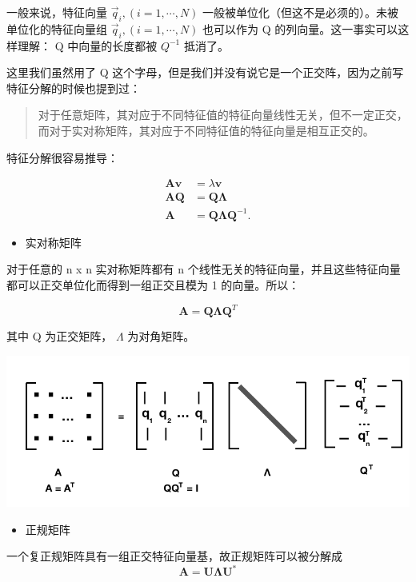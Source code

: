 \documentclass[
]{book}
\providecommand{\tightlist}{%
  \setlength{\itemsep}{0pt}\setlength{\parskip}{0pt}}
\begin{document}
一般来说，特征向量 \(\vec{q}_i, ( i = 1, \cdots, N)\) 一般被单位化（但这不是必须的）。未被单位化的特征向量组 \(\vec{q}_i, ( i = 1, \cdots, N)\) 也可以作为 Q 的列向量。这一事实可以这样理解： Q 中向量的长度都被 \(Q^{-1}\) 抵消了。

这里我们虽然用了 Q 这个字母，但是我们并没有说它是一个正交阵，因为之前写特征分解的时候也提到过：

\begin{quote}
对于任意矩阵，其对应于不同特征值的特征向量线性无关，但不一定正交，而对于实对称矩阵，其对应于不同特征值的特征向量是相互正交的。
\end{quote}

特征分解很容易推导：

\[
{\displaystyle {\begin{aligned}\mathbf {A} \mathbf {v} &=\lambda \mathbf {v} \\\mathbf {A} \mathbf {Q} &=\mathbf {Q} \mathbf {\Lambda } \\\mathbf {A} &=\mathbf {Q} \mathbf {\Lambda } \mathbf {Q} ^{-1}.\end{aligned}}}
\]

\begin{itemize}
\tightlist
\item
  实对称矩阵
\end{itemize}

对于任意的 n x n 实对称矩阵都有 n 个线性无关的特征向量，并且这些特征向量都可以正交单位化而得到一组正交且模为 1 的向量。所以：

\[\mathbf{A}=\mathbf{Q}\mathbf{\Lambda}\mathbf{Q}^{T}  \]

其中 Q 为正交矩阵， \(\Lambda\) 为对角矩阵。

\includegraphics{images/eigen_01.png}

\begin{itemize}
\tightlist
\item
  正规矩阵
\end{itemize}

一个复正规矩阵具有一组正交特征向量基，故正规矩阵可以被分解成
\[\mathbf{A}=\mathbf{U}\mathbf{\Lambda}\mathbf{U}^{*}  \]
\end{document}
